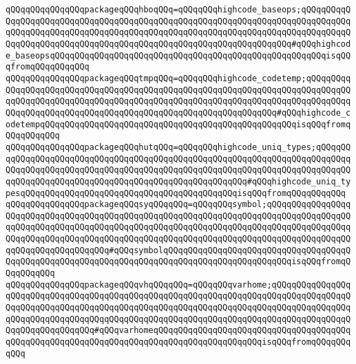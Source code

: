 \verb|qQQqqQQqqQQqqQQqpackageqQQqhboqQQq=qQQqqQQqhighcode_baseops;qQQqqQQqqQQqqQQqqQQqqQQqqQQqqQQqqQQqqQQqqQQqqQQqqQQqqQQqqQQqqQQqqQQqqQQqqQQqqQQqqQQqqQQqqQQqqQQqqQQqqQQqqQQqqQQqqQQqqQQqqQQqqQQqqQQqqQQqqQQqqQQqqQQqqQQqqQQqqQQqqQQqqQQqqQQqqQQqqQQqqQQqqQQqqQQqqQQqqQQqqQQqqQQq#qQQqhighcode_baseopsqQQqqQQqqQQqqQQqqQQqqQQqqQQqqQQqqQQqqQQqqQQqqQQqqQQqqQQqisqQQqfromqQQqqQQqqQQq|\newline
\verb|qQQqqQQqqQQqqQQqpackageqQQqtmpqQQq=qQQqqQQqhighcode_codetemp;qQQqqQQqqQQqqQQqqQQqqQQqqQQqqQQqqQQqqQQqqQQqqQQqqQQqqQQqqQQqqQQqqQQqqQQqqQQqqQQqqQQqqQQqqQQqqQQqqQQqqQQqqQQqqQQqqQQqqQQqqQQqqQQqqQQqqQQqqQQqqQQqqQQqqQQqqQQqqQQqqQQqqQQqqQQqqQQqqQQqqQQqqQQqqQQqqQQqqQQqqQQq#qQQqhighcode_codetempqQQqqQQqqQQqqQQqqQQqqQQqqQQqqQQqqQQqqQQqqQQqqQQqqQQqisqQQqfromqQQqqQQqqQQq|\newline
\verb|qQQqqQQqqQQqqQQqpackageqQQqhutqQQq=qQQqqQQqhighcode_uniq_types;qQQqqQQqqQQqqQQqqQQqqQQqqQQqqQQqqQQqqQQqqQQqqQQqqQQqqQQqqQQqqQQqqQQqqQQqqQQqqQQqqQQqqQQqqQQqqQQqqQQqqQQqqQQqqQQqqQQqqQQqqQQqqQQqqQQqqQQqqQQqqQQqqQQqqQQqqQQqqQQqqQQqqQQqqQQqqQQqqQQqqQQqqQQqqQQqqQQq#qQQqhighcode_uniq_typesqQQqqQQqqQQqqQQqqQQqqQQqqQQqqQQqqQQqqQQqqQQqisqQQqfromqQQqqQQqqQQq|\newline
\verb|qQQqqQQqqQQqqQQqpackageqQQqsyqQQqqQQq=qQQqqQQqsymbol;qQQqqQQqqQQqqQQqqQQqqQQqqQQqqQQqqQQqqQQqqQQqqQQqqQQqqQQqqQQqqQQqqQQqqQQqqQQqqQQqqQQqqQQqqQQqqQQqqQQqqQQqqQQqqQQqqQQqqQQqqQQqqQQqqQQqqQQqqQQqqQQqqQQqqQQqqQQqqQQqqQQqqQQqqQQqqQQqqQQqqQQqqQQqqQQqqQQqqQQqqQQqqQQqqQQqqQQqqQQqqQQqqQQqqQQqqQQqqQQqqQQqqQQq#qQQqsymbolqQQqqQQqqQQqqQQqqQQqqQQqqQQqqQQqqQQqqQQqqQQqqQQqqQQqqQQqqQQqqQQqqQQqqQQqqQQqqQQqqQQqqQQqqQQqqQQqisqQQqfromqQQqqQQqqQQq|\newline
\verb|qQQqqQQqqQQqqQQqpackageqQQqvhqQQqqQQq=qQQqqQQqvarhome;qQQqqQQqqQQqqQQqqQQqqQQqqQQqqQQqqQQqqQQqqQQqqQQqqQQqqQQqqQQqqQQqqQQqqQQqqQQqqQQqqQQqqQQqqQQqqQQqqQQqqQQqqQQqqQQqqQQqqQQqqQQqqQQqqQQqqQQqqQQqqQQqqQQqqQQqqQQqqQQqqQQqqQQqqQQqqQQqqQQqqQQqqQQqqQQqqQQqqQQqqQQqqQQqqQQqqQQqqQQqqQQqqQQqqQQqqQQqqQQqqQQq#qQQqvarhomeqQQqqQQqqQQqqQQqqQQqqQQqqQQqqQQqqQQqqQQqqQQqqQQqqQQqqQQqqQQqqQQqqQQqqQQqqQQqqQQqqQQqqQQqqQQqisqQQqfromqQQqqQQqqQQq|\newline
